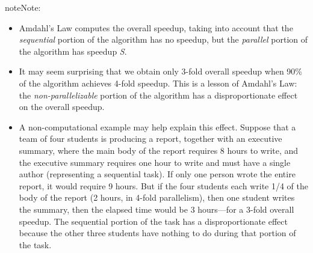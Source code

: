 \documentclass[letterpaper,10pt,openany,oneside]{sphinxmanual}
\begin{document}
\begin{notice}{note}{Note:}\begin{itemize}
\item {} 
Amdahl's Law computes the overall speedup, taking into account that the \emph{sequential} portion of the algorithm has no speedup, but the \emph{parallel} portion of the algorithm has speedup \emph{S}.

\item {} 
It may seem surprising that we obtain only 3-fold overall speedup when 90\% of the algorithm achieves 4-fold speedup. This is a lesson of Amdahl's Law: the \emph{non-parallelizable} portion of the algorithm has a disproportionate effect on the overall speedup.

\item {} 
A non-computational example may help explain this effect. Suppose that a team of four students is producing a report, together with an executive summary, where the main body of the report requires 8 hours to write, and the executive summary requires one hour to write and must have a single author (representing a sequential task). If only one person wrote the entire report, it would require 9 hours. But if the four students each write 1/4 of the body of the report (2 hours, in 4-fold parallelism), then one student writes the summary, then the elapsed time would be 3 hours---for a 3-fold overall speedup. The sequential portion of the task has a disproportionate effect because the other three students have nothing to do during that portion of the task.

\end{itemize}
\end{notice}
\end{document}
